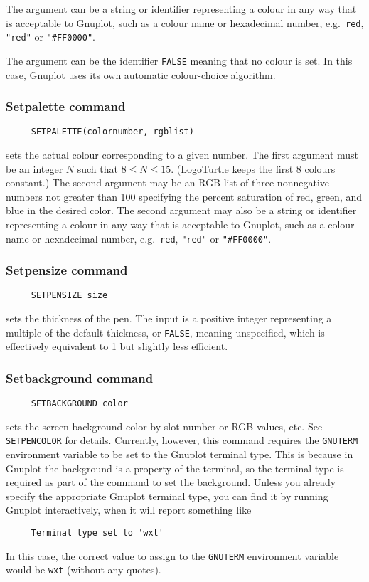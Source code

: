 The argument can be a string or identifier representing a colour in
any way that is acceptable to Gnuplot, such as a colour name or
hexadecimal number, e.g.\ \texttt{red}, \texttt{"red"} or
\texttt{"\#FF0000"}.

The argument can be the identifier \texttt{FALSE} meaning that no
colour is set.  In this case, Gnuplot uses its own automatic
colour-choice algorithm.

\subsubsection*{Setpalette command}
\begin{verbatim}
     SETPALETTE(colornumber, rgblist)
\end{verbatim}
sets the actual colour corresponding to a given number.  The first
argument must be an integer $N$ such that $8 \le N \le
15$. (LogoTurtle keeps the first 8 colours constant.)  The second
argument may be an RGB list of three nonnegative numbers not greater
than 100 specifying the percent saturation of red, green, and blue in
the desired color.  The second argument may also be a string or
identifier representing a colour in any way that is acceptable to
Gnuplot, such as a colour name or hexadecimal number,
e.g.\ \texttt{red}, \texttt{"red"} or \texttt{"\#FF0000"}.

\subsubsection*{Setpensize command}
\begin{verbatim}
     SETPENSIZE size
\end{verbatim}
sets the thickness of the pen.  The input is a positive integer
representing a multiple of the default thickness, or \texttt{FALSE},
meaning unspecified, which is effectively equivalent to 1 but slightly
less efficient.

\subsubsection*{Setbackground command}
\begin{verbatim}
     SETBACKGROUND color
\end{verbatim}
sets the screen background color by slot number or RGB values, etc.
See \hyperref[logoturtle:setpencolor]{\texttt{SETPENCOLOR}} for
details.  Currently, however, this command requires the
\texttt{GNUTERM} environment variable to be set to the Gnuplot
terminal type.  This is because in Gnuplot the background is a
property of the terminal, so the terminal type is required as part of
the command to set the background.  Unless you already specify the
appropriate Gnuplot terminal type, you can find it by running Gnuplot
interactively, when it will report something like
\begin{verbatim}
     Terminal type set to 'wxt'
\end{verbatim}
In this case, the correct value to assign to the \texttt{GNUTERM}
environment variable would be \texttt{wxt} (without any quotes).


